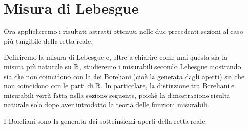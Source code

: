 \section{Misura di Lebesgue}
Ora applicheremo i risultati astratti ottenuti nelle due precedenti sezioni al caso più tangibile della retta reale.

Definiremo la misura di Lebesgue e, oltre a chiarire come mai questa sia la misura più naturale su $\mathbb R$, studieremo i misurabili secondo Lebesgue mostrando sia che non coincidono con la \sigalg{} dei Boreliani (cioè la \sigalg{} generata dagli aperti) sia che non coincidono con le parti di $\mathbb R$.
In particolare, la distinzione tra Boreliani e misurabili verrà fatta nella sezione seguente, poichè la dimostrazione risulta naturale solo dopo aver introdotto la teoria delle funzioni misurabili.

\begin{definition}
	I Boreliani sono la \sigalg{} generata dai sottoinsiemi aperti della retta reale.
\end{definition}

\newcommand{\so}[2]{\ensuremath{[\,#1,\,#2\,)}}
\newcommand{\oo}[2]{\ensuremath{(\,#1,\,#2\,)}}
\newcommand{\cc}[2]{\ensuremath{[\,#1,\,#2\,]}}

